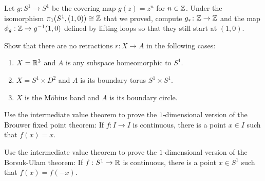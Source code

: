 \documentclass[12pt]{article}
\begin{document}
\begin{problab}{2}
    Let $g\colon S^1 \to S^1$ be the covering map $g(z) = z^n$ for $n \in \mathbb{Z}$. Under the isomorphism $\pi_1(S^1, (1,0)) \cong \mathbb{Z}$ that we proved, compute $g_* \colon \mathbb{Z} \to \mathbb{Z}$ and the map $\phi_g: \mathbb{Z} \to g^{-1}(1,0)$ defined by lifting loops so that they still start at $(1,0)$.
\end{problab}
\begin{solu}

\end{solu}
\newpage

\begin{problab}{3}
    Show that there are no retractions $r \colon X \to A$ in the following cases:
    \begin{enumerate}
    \item $X = \mathbb R^3$ and $A$ is any subspace homeomorphic to $S^1$.
    \item $X = S^1 \times D^2$ and $A$ is its boundary torus $S^1 \times S^1$.
    \item $X$ is the M{\" o}bius band and $A$ is its boundary circle.
    \end{enumerate}
\end{problab}
\begin{solu}

\end{solu}
\newpage

\begin{problab}{4}
    Use the intermediate value theorem to prove the $1$-dimensional version of the Brouwer fixed point theorem: If $f \colon I \to I$ is continuous, there is a point $x \in I$ such that $f(x) = x$. 
\end{problab}
\begin{solu}

\end{solu}
\newpage

\begin{problab}{5}
    Use the intermediate value theorem to prove the $1$-dimensional version of the Borsuk-Ulam theorem: If $f: S^1 \to \mathbb R$ is continuous, there is a point $x \in S^1$ such that $f(x) = f(-x)$.
\end{problab}
\begin{solu}

\end{solu}
\end{document}
